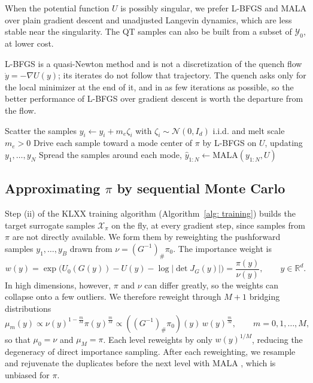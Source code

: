 \documentclass{article}
\begin{document}
When the potential function $U$ is possibly singular, we prefer L-BFGS and MALA over plain gradient descent and unadjusted Langevin dynamics, which are less stable near the singularity. The QT samples can also be built from a subset of $\mathcal Y_0$, at lower cost.

\begin{remark}
	L-BFGS is a quasi-Newton method \citep{liu1989limited} and is not a discretization of the quench flow $\dot y = -\nabla U(y)$; its iterates do not follow that trajectory. The quench asks only for the local minimizer at the end of it, and in as few iterations as possible, so the better performance of L-BFGS over gradient descent is worth the departure from the flow.
\end{remark}

\begin{algorithm}[htb]
\caption{QT: wide-coverage construction}
\label{alg: QT}
Scatter the samples $y_i \gets y_i + m_e\zeta_i$ with $\zeta_i \sim \mathcal N(0, I_d)$ i.i.d. and melt scale $m_e > 0$\;
Drive each sample toward a mode center of $\pi$ by L-BFGS on $U$, updating $y_1,\dots,y_N$\;
Spread the samples around each mode, $\hat y_{1:N} \gets \mathrm{MALA}(y_{1:N}, U)$\;
\end{algorithm}

\subsection{Approximating $\pi$ by sequential Monte Carlo}
\label{subsec: annealing}

Step (ii) of the KLXX training algorithm (Algorithm~\ref{alg: training}) builds the target surrogate samples $\mathcal X_{\pi}$ on the fly, at every gradient step, since samples from $\pi$ are not directly available. We form them by reweighting the pushforward samples $y_1,\dots,y_B$ drawn from $\nu=(G^{-1})_{\#}\pi_0$. The importance weight is
\begin{equation}
	w(y)
	= \exp\Big( U_0(G(y)) - U(y) - \log|\det J_G(y)| \Big)
	= \frac{\pi(y)}{\nu(y)},
	\qquad y \in \mathbb R^d.
	\label{eq: weight}
\end{equation}
In high dimensions, however, $\pi$ and $\nu$ can differ greatly, so the weights can collapse onto a few outliers. We therefore reweight through $M+1$ bridging distributions
\begin{equation}
	\mu_m(y) \propto \nu(y)^{1-\frac{m}{M}} \pi(y)^{\frac{m}{M}} \propto ((G^{-1})_{\#}\pi_0)(y)\, w(y)^{\frac{m}{M}}, \qquad m = 0,1,\dots,M,
	\label{eq: mu-m}
\end{equation}
so that $\mu_0 = \nu$ and $\mu_M = \pi$. Each level reweights by only $w(y)^{1/M}$, reducing the degeneracy of direct importance sampling.
After each reweighting, we resample and rejuvenate the duplicates before the next level with MALA \citep{roberts1996exponential}, which is unbiased for $\pi$.
\end{document}
